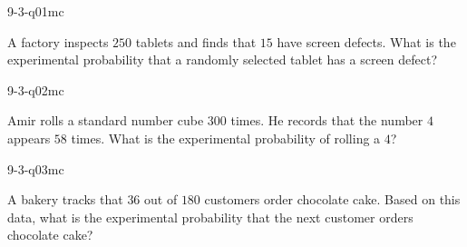 

\begin{practiceQuestion}{9-3-q01}{mc}
\begin{questionText}
A factory inspects $250$ tablets and finds that $15$ have screen defects. What is the experimental probability that a randomly selected tablet has a screen defect?
\end{questionText}
\end{practiceQuestion}

\begin{practiceQuestion}{9-3-q02}{mc}
\begin{questionText}
Amir rolls a standard number cube $300$ times. He records that the number $4$ appears $58$ times. What is the experimental probability of rolling a $4$?
\end{questionText}
\end{practiceQuestion}

\begin{practiceQuestion}{9-3-q03}{mc}
\begin{questionText}
A bakery tracks that $36$ out of $180$ customers order chocolate cake. Based on this data, what is the experimental probability that the next customer orders chocolate cake?
\end{questionText}
\end{practiceQuestion}

